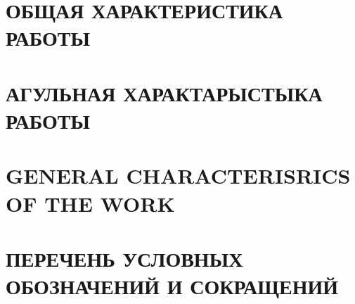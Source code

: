 \chapter*{ОБЩАЯ ХАРАКТЕРИСТИКА РАБОТЫ}

\chapter*{АГУЛЬНАЯ ХАРАКТАРЫСТЫКА РАБОТЫ}

\chapter*{GENERAL CHARACTERISRICS OF THE WORK}

\chapter*{ПЕРЕЧЕНЬ УСЛОВНЫХ ОБОЗНАЧЕНИЙ И СОКРАЩЕНИЙ}
